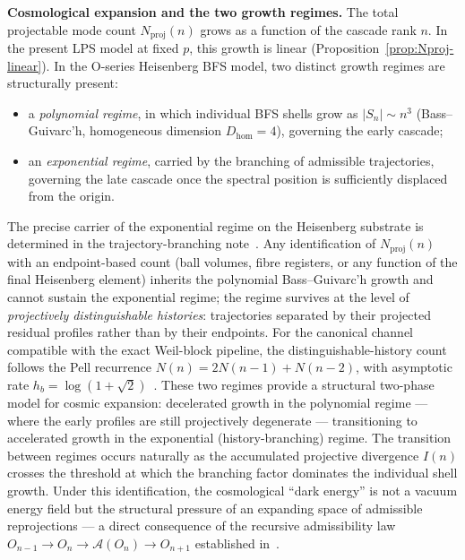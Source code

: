 \documentclass[12pt, a4paper]{article}
\theoremstyle{plain}
\theoremstyle{definition}
\theoremstyle{remark}
\begin{document}
      \medskip
      \noindent\textbf{Cosmological expansion and the two growth regimes.}
      The total projectable mode count $N_{\mathrm{proj}}(n)$ grows as a function of
      the cascade rank $n$.
      In the present LPS model at fixed $p$, this growth is linear
      (Proposition~\ref{prop:Nproj-linear}).
      In the O-series Heisenberg BFS model, two distinct growth regimes are
      structurally present:
      \begin{itemize}
        \item a \emph{polynomial regime}, in which individual BFS shells grow as
        $|S_n| \sim n^3$ (Bass--Guivarc'h, homogeneous dimension $D_{\mathrm{hom}} = 4$),
        governing the early cascade;
        \item an \emph{exponential regime}, carried by the branching of admissible
        trajectories, governing the late cascade once the spectral position is
        sufficiently displaced from the origin.
      \end{itemize}
      The precise carrier of the exponential regime on the Heisenberg substrate is
      determined in the trajectory-branching note~\cite{Beau2026tb}.
      Any identification of $N_{\mathrm{proj}}(n)$ with an endpoint-based count
      (ball volumes, fibre registers, or any function of the final Heisenberg
      element) inherits the polynomial Bass--Guivarc'h growth and cannot sustain
      the exponential regime; the regime survives at the level of
      \emph{projectively distinguishable histories}: trajectories separated by
      their projected residual profiles rather than by their endpoints.
      For the canonical channel compatible with the exact Weil-block pipeline, the
      distinguishable-history count follows the Pell recurrence
      $N(n) = 2N(n-1) + N(n-2)$, with asymptotic rate
      $h_b = \log(1+\sqrt{2})$~\cite{Beau2026tb}.
      These two regimes provide a structural two-phase model for cosmic expansion:
      decelerated growth in the polynomial regime --- where the early profiles are
      still projectively degenerate --- transitioning to accelerated growth in the
      exponential (history-branching) regime.
      The transition between regimes occurs naturally as the accumulated projective
      divergence $I(n)$ crosses the threshold at which the branching factor dominates
      the individual shell growth.
      Under this identification, the cosmological ``dark energy'' is not a vacuum
      energy field but the structural pressure of an expanding space of admissible
      reprojections --- a direct consequence of the recursive admissibility law
      $O_{n-1} \to O_n \to \mathcal{A}(O_n) \to O_{n+1}$ established
      in~\cite{Beau2026m}.
\end{document}
